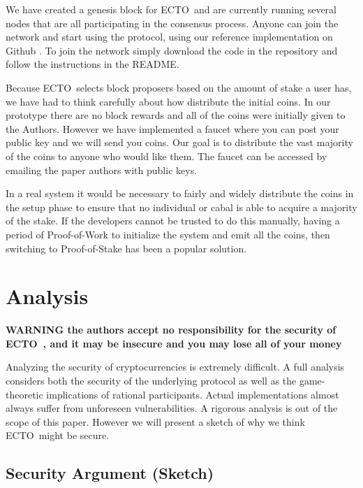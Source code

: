 \documentclass{article}
\newcommand{\coin}{ \textsc{ECTO}\ }
\begin{document}
We have created a genesis block for \coin and are currently running several nodes that are all participating in the consensus process. Anyone can join the network and start using the protocol, using our reference implementation on Github \cite{6824coincode}. To join the network simply download the code in the repository and follow the instructions in the README.

Because \coin selects block proposers based on the amount of stake a user has, we have had to think carefully about how distribute the initial coins. In our prototype there are no block rewards and all of the coins were initially given to the Authors. However we have implemented a faucet where you can post your public key and we will send you coins. Our goal is to distribute the vast majority of the coins to anyone who would like them. The faucet can be accessed by emailing the paper authors with public keys.

In a real system it would be necessary to fairly and widely distribute the coins in the setup phase to ensure that no individual or cabal is able to acquire a majority of the stake. If the developers cannot be trusted to do this manually, having a period of Proof-of-Work to initialize the system and emit all the coins, then switching to Proof-of-Stake has been a popular solution.

\section{Analysis}
\begin{centering}
{\color{red} \large { \textbf{ WARNING the authors accept no responsibility for the security of \coin, and it may be insecure and you may lose all of your money } } } 
\end{centering}

Analyzing the security of cryptocurrencies is extremely difficult. A full analysis considers both the security of the underlying protocol as well as the game-theoretic implications of rational participants. Actual implementations almost always suffer from unforeseen vulnerabilities. A rigorous analysis is out of the scope of this paper. However we will present a sketch of why we think \coin might be secure.

\subsection{Security Argument (Sketch)}\label{security}
\end{document}
